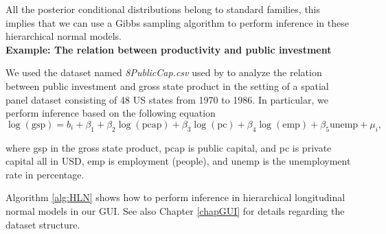 All the posterior conditional distributions belong to standard families, this implies that we can use a Gibbs sampling algorithm to perform inference in these hierarchical normal models.\\

\textbf{Example: The relation between productivity and public investment}

We used the dataset named \textit{8PublicCap.csv} used by \cite{Ramirez2017} to analyze the relation  between public investment and gross state product in the setting of a spatial panel dataset consisting of 48 US states from 1970 to 1986.
In particular, we perform inference based on the following equation 
\begin{equation*}
	\log(\text{gsp})=b_i+\beta_1+\beta_2\log(\text{pcap})+\beta_3\log(\text{pc})+\beta_4\log(\text{emp})+\beta_5\text{unemp}+\mu_i,
\end{equation*}

where gsp in the gross state product, pcap is public capital, and pc is private capital all in USD, emp is employment (people), and unemp is the unemployment rate in percentage.

Algorithm \ref{alg:HLN} shows how to perform inference in hierarchical longitudinal normal models in our GUI. See also Chapter \ref{chapGUI} for details regarding the dataset structure.

